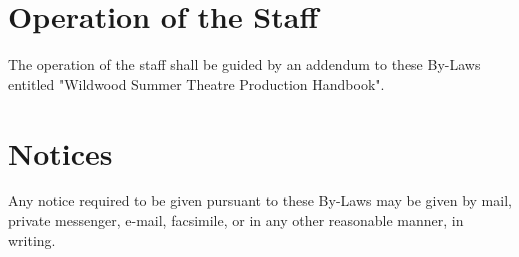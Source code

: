 \documentclass{wst}
\begin{document}
\section{Operation of the Staff}
The operation of the staff shall be guided by an addendum to these By-Laws entitled "Wildwood Summer Theatre Production Handbook".

\section{Notices}
Any notice required to be given pursuant to these By-Laws may be given by mail, private messenger, e-mail, facsimile, or in any other reasonable manner, in writing.
\end{document}
